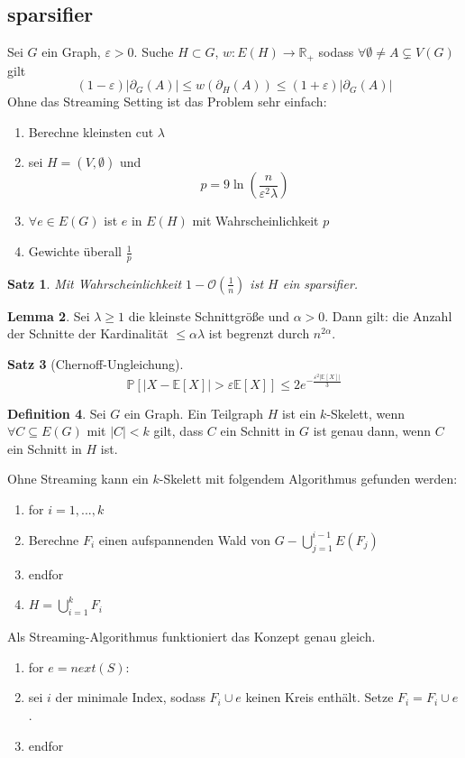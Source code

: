 \documentclass[a4paper, 12pt]{article}
\theoremstyle{plain}
\newtheorem{theorem}{Satz}[subsection] %
\theoremstyle{definition}
\newtheorem{definition}[theorem]{Definition} %
\theoremstyle{lemma}
\newtheorem{lemma}[theorem]{Lemma}
\theoremstyle{remark}
\theoremstyle{corollary}
\theoremstyle{example}
\begin{document}
	\subsection{sparsifier}
	Sei $G$ ein Graph, $\varepsilon>0$. Suche $H\subset G$, $w:E(H) \to \mathbb{R}_+$ sodass $\forall \emptyset \neq A \subsetneq V(G)$ gilt \[(1-\varepsilon) \left|\partial_G(A)\right| \leq w(\partial_H(A)) \leq (1+\varepsilon) \left|\partial_G(A)\right|\]
	Ohne das Streaming Setting ist das Problem sehr einfach: \begin{enumerate}
		\item Berechne kleinsten cut $\lambda$
		\item sei $H = (V,\emptyset)$ und \[p = 9\ln (\frac{n}{\varepsilon^2 \lambda})\]
		\item $\forall e\in E(G)$ ist $e$ in $E(H)$ mit Wahrscheinlichkeit $p$
		\item Gewichte überall $\frac{1}{p}$
	\end{enumerate}
	\begin{theorem}
		Mit Wahrscheinlichkeit $1-\mathcal{O}(\frac{1}{n})$ ist $H$ ein sparsifier.
	\end{theorem}
	\begin{lemma}
		Sei $\lambda \geq 1$ die kleinste Schnittgröße und $\alpha > 0$. Dann gilt: die Anzahl der Schnitte der Kardinalität $\leq \alpha\lambda$ ist begrenzt durch $n^{2\alpha}$.
	\end{lemma}
	\begin{theorem}[Chernoff-Ungleichung]
		\[\mathbb{P}[\left|X-\mathbb{E}[X]\right| > \varepsilon \mathbb{E}[X]] \leq 2e^{-\frac{\varepsilon^2\left|\mathbb{E}[X]\right|}{3}}\]
	\end{theorem}
	\begin{definition}
		Sei $G$ ein Graph. Ein Teilgraph $H$ ist ein $k$-Skelett, wenn $\forall C \subseteq E(G)$ mit $\left|C\right|< k$ gilt, dass $C$ ein Schnitt in $G$ ist genau dann, wenn $C$ ein Schnitt in $H$ ist.
	\end{definition}
	Ohne Streaming kann ein $k$-Skelett mit folgendem Algorithmus gefunden werden:
	\begin{enumerate}
		\item for $i=1,...,k$
		\item Berechne $F_i$ einen aufspannenden Wald von $G-\bigcup_{j=1}^{i-1} E(F_j)$
		\item endfor
		\item $H = \bigcup_{i=1}^k F_i$
	\end{enumerate}
	Als Streaming-Algorithmus funktioniert das Konzept genau gleich.
	\begin{enumerate}
		\item for $e=next(S)$:
		\item sei $i$ der minimale Index, sodass $F_i\cup e$ keinen Kreis enthält. Setze $F_i = F_i \cup e$.
		\item endfor
	\end{enumerate}
\end{document}
